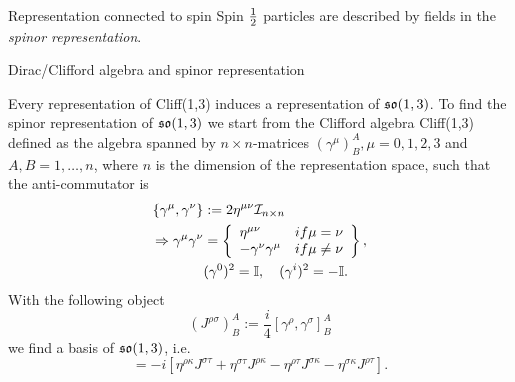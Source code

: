 \begin{mybox}{Representation connected to spin }
	Spin $\frac{1}{2}$ particles are described by fields in the \emph{spinor representation}.
\end{mybox}
\begin{mybox}{Dirac/Clifford algebra and spinor representation}
	
	Every representation of Cliff(1,3) induces a representation of $\mathfrak{so}(1,3)$. To find the spinor representation of $\mathfrak{so}(1,3)$ we start from the Clifford algebra Cliff(1,3) defined as the algebra spanned by $n \times n$-matrices $(\gamma^{\mu})^A_B, \mu=0,1,2,3$ and $A,B=1,\dots,n$, where $n$ is the dimension of the representation space, such that the anti-commutator is
	\begin{align}
		\{\gamma^{\mu}, \gamma^{\nu} \} & := 2 \eta^{\mu \nu} \mathcal{I}_{n\times n} \\
		\Rightarrow \gamma^{\mu} \gamma^{\nu} &= 
		\left\{ \begin{array}{lr}
			\eta^{\mu \nu} & if \mu =\nu \\
			- \gamma^{\nu} \gamma^{\mu} & if \mu\neq \nu
		\end{array}		\right\},
		\\
		&(\gamma^0)^2=\mathbb{I},\quad (\gamma^i)^2 = - \mathbb{I}.
	\end{align}
	With the following object 
	\begin{equation}
	(J^{\rho \sigma})^A_B := \frac{i}{4} [\gamma^{\rho},\gamma^{\sigma}]^A_B
	\end{equation}
	we find a basis of $\mathfrak{so}(1,3)$, i.e.
	\begin{equation}
	[J^{\rho \sigma}, J^{\tau \kappa} ] = -i \left[\eta^{\rho \kappa} J^{\sigma \tau} + \eta^{\sigma \tau} J^{\rho \kappa} - \eta^{\rho \tau} J^{\sigma \kappa} - \eta^{\sigma \kappa} J^{\rho \tau} \right].
	\end{equation}
\end{mybox}

